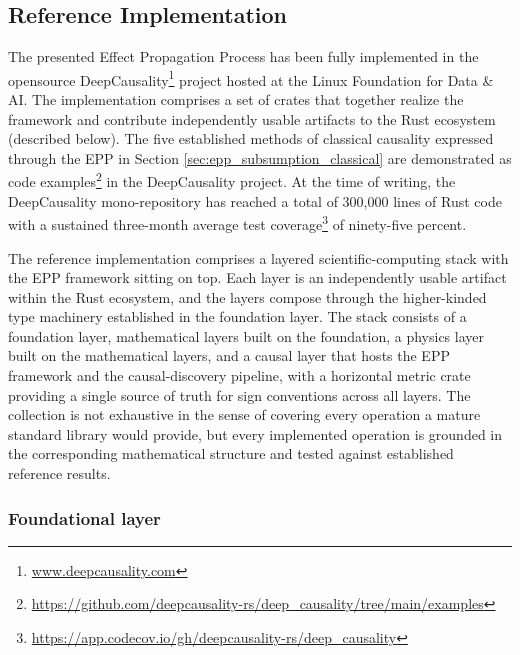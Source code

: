 \subsection{Reference Implementation}

The presented Effect Propagation Process has been fully implemented in the open\-source DeepCausality\footnote{\url{www.deepcausality.com}} project hosted at the Linux Foundation for Data \& AI. The implementation comprises a set of crates that together realize the framework and contribute independently usable artifacts to the Rust ecosystem (described below). The five established methods of classical causality expressed through the EPP in Section \ref{sec:epp_subsumption_classical} are demonstrated as code examples\footnote{\url{https://github.com/deepcausality-rs/deep_causality/tree/main/examples}} in the DeepCausality project. At the time of writing, the DeepCausality mono-repository has reached a total of 300,000 lines of Rust code with a sustained three-month average test coverage\footnote{\url{https://app.codecov.io/gh/deepcausality-rs/deep_causality}} of ninety-five percent.


The reference implementation comprises a layered scientific-computing stack with the EPP framework sitting on top. Each layer is an independently usable artifact within the Rust ecosystem, and the layers compose through the higher-kinded type machinery established in the foundation layer. The stack consists of a foundation layer, mathematical layers built on the foundation, a physics layer built on the mathematical layers, and a causal layer that hosts the EPP framework and the causal-discovery pipeline, with a horizontal metric crate providing a single source of truth for sign conventions across all layers. The collection is not exhaustive in the sense of covering every operation a mature standard library would provide, but every implemented operation is grounded in the corresponding mathematical structure and tested against established reference results.

\subsubsection{Foundational layer}



